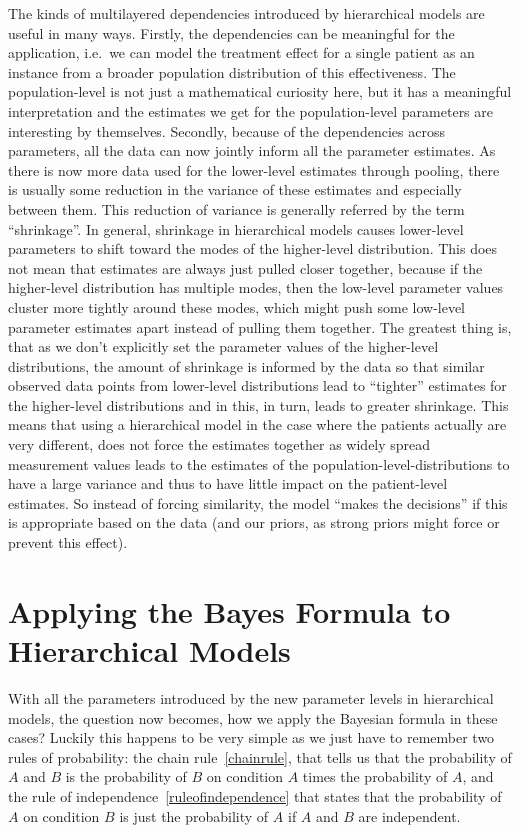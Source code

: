 \documentclass[12pt,a4paper,leqno]{report}
\theoremstyle{plain}
\theoremstyle{definition}
\theoremstyle{remark}
\begin{document}
The kinds of multilayered dependencies introduced by hierarchical models are useful in many ways.
Firstly, the dependencies can be meaningful for the application, i.e.\ we can
model the treatment effect for a single patient as an instance from a
broader population distribution of this effectiveness. The population-level is not just
a mathematical curiosity here, but it has a meaningful interpretation and the estimates we
get for the population-level parameters are interesting by themselves. Secondly, because
of the dependencies across parameters, all the data can now jointly inform all the
parameter estimates. As there is now more data used for the lower-level estimates through
pooling, there is usually some reduction in the variance of these estimates
and especially between them. This reduction of variance is
generally referred by the term ``shrinkage''. In general,
shrinkage in hierarchical models causes lower-level parameters to shift toward the modes
of the higher-level distribution. This does not mean that
estimates are always just pulled closer together, because if the higher-level
distribution has multiple modes, then the low-level parameter values cluster
more tightly around these modes, which might push some
low-level parameter estimates apart instead of pulling them together. The greatest thing
is, that as we don't explicitly set the parameter values of the higher-level
distributions, the amount of shrinkage is informed by the data so that
similar observed data points from lower-level distributions lead to ``tighter''
estimates for the higher-level distributions and in this, in turn, leads to
greater shrinkage. This means that using a hierarchical model in the case where the
patients actually are very different, does not force the estimates together as
widely spread measurement values leads to the estimates of the population-level-distributions to
have a large variance and thus to have little impact on the patient-level estimates. So
instead of forcing similarity, the model ``makes the decisions'' if this is appropriate
based on the data (and our priors, as strong priors might force or prevent this effect).

\section{Applying the Bayes Formula to Hierarchical Models}

With all the parameters introduced by the new parameter levels in hierarchical models,
the question now becomes, how we apply
the Bayesian formula in these cases? Luckily this happens to be very simple as we just
have to remember two rules of probability: the chain rule\ \ref{chainrule}, that
tells us that the probability of \(A\) and \(B\) is the probability of \(B\) on condition \(A\)
times the probability of \(A\), and the rule of independence\ \ref{ruleofindependence}
that states that the
probability of \(A\) on condition \(B\) is just the probability of \(A\) if \(A\) and
\(B\) are independent.
\end{document}
